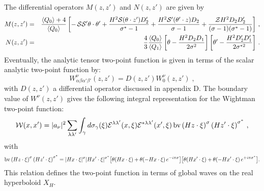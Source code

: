 \documentclass[a4paper,11pt,showpacs,preprintnumbers]{revtex4}
\def\z {{\cal Z}}
\begin{document}
The differential operators $M(z,z')$ and $N(z,z')$ are given by
\begin{eqnarray}\label{eqn:fetg}
M(z,z')&=&\frac{\langle Q_{0}\rangle+4}{\langle Q_{0}\rangle
}\left[-\,{\cal S }{\cal S' } \theta\cdot\theta'+\frac{H^{2}{\cal
S }(\theta\cdot z')D'_{2}}{\sigma^{*}-1}+\frac{H^{2}{\cal S'
}(\theta'\cdot z)D_{2}}{\sigma-1}+\frac{\z H^{2}D_{2}D'_{2}}{
(\sigma-1)(\sigma^{*}-1)}\right]\,,
\nonumber\\
N(z,z')&=&\frac{4}{3}\frac{\langle Q_{0}\rangle }{\langle
Q_{1}\rangle }\left[
\theta-\frac{H^{2}D_{2}D_{1}}{2\sigma^{2}}\right]\left[
\theta'-\frac{H^{2}D'_{2}D'_{1}}{2\sigma^{*2}}\right]\,.
\end{eqnarray}
Eventually, the analytic tensor two-point function is given in
terms of the scalar analytic two-point function by:
$$W^{\nu}_{\alpha\beta
\alpha'\beta'}(z,z')=D(z,z') W_{0}^{\nu}(z,z')\;,$$ with $D(z,z')$
a differential operator discussed in appendix D. The boundary
value of $W^\nu (z,z')$ gives the following integral
representation for the Wightman two-point function:
\begin{equation}
 {\cal W}(x,x')=
\vert
a_{\nu}\vert^{2}\sum_{\lambda\lambda'}\int_{\gamma}d\sigma_{\gamma}(\xi)
{\cal E}^{\lambda\lambda'}(x,\xi) {\cal
E}^{*\lambda\lambda'}(x',\xi) \,\mbox{bv} \left(H
z\cdot\xi\right)^{\sigma} \left(H z'\cdot\xi\right)^{\sigma^*} \,,
\end{equation}
with
\begin{equation}
\mbox{bv} \left(H z\cdot\xi\right)^{\sigma} \left(H
z'\cdot\xi\right)^{\sigma^*}= \vert H x\cdot\xi\vert^{\sigma}
\vert H x'\cdot\xi\vert^{\sigma^*} \big{[}\theta(H x\cdot \xi) +
\theta(-H x\cdot\xi)\,e^{-i\pi \sigma } \big{]} \big{[} \theta(H
x'\cdot \xi) + \theta(-H x'\cdot\xi)\,e^{+i\pi \sigma^{*} }
\big{]}.
\end{equation}
This relation defines the two-point function in terms of global
waves on the real hyperboloid $X_H$.
\end{document}
